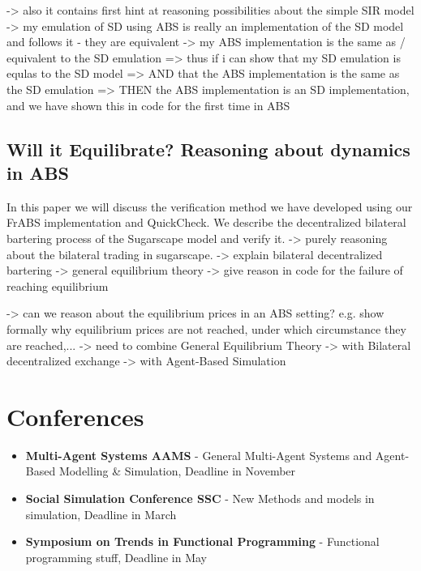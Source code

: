 -> also it contains first hint at reasoning possibilities about the simple SIR model
		-> my emulation of SD using ABS is really an implementation of the SD model and follows it - they are equivalent
		-> my ABS implementation is the same as / equivalent to the SD emulation
			=> thus if i can show that my SD emulation is equlas to the SD model
			=> AND that the ABS implementation is the same as the SD emulation
			=> THEN the ABS implementation is an SD implementation, and we have shown this in code for the first time in ABS

\subsection{Will it Equilibrate? Reasoning about dynamics in ABS}
In this paper we will discuss the verification method we have developed using our FrABS implementation and QuickCheck. We describe the decentralized bilateral bartering process of the Sugarscape model and verify it.
-> purely reasoning about the bilateral trading in sugarscape.
	-> explain bilateral decentralized bartering
	-> general equilibrium theory
	-> give reason in code for the failure of reaching equilibrium

-> can we reason about the equilibrium prices in an ABS setting? e.g. show formally why equilibrium prices are not reached, under which circumstance they are reached,...
			-> need to combine General Equilibrium Theory
			-> with Bilateral decentralized exchange
			-> with Agent-Based Simulation 
			
\section{Conferences}
\begin{itemize}
	\item \textbf{Multi-Agent Systems AAMS} - General Multi-Agent Systems and Agent-Based Modelling \& Simulation, Deadline in November
	\item \textbf{Social Simulation Conference SSC} - New Methods and models in simulation, Deadline in March
	\item \textbf{Symposium on Trends in Functional Programming} - Functional programming stuff, Deadline in May
\end{itemize}

